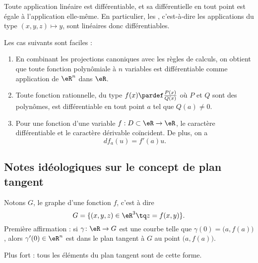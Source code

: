 Toute application linéaire est différentiable, et sa différentielle en
tout point est égale à l'application elle-même. En particulier, les
, c'est-à-dire les applications du type
$(x,y,z) \mapsto y$, sont linéaires donc différentiables.

\begin{example}
Les cas suivants sont faciles :
  \begin{enumerate}
  \item En combinant les projections canoniques avec les règles de
    calculs, on obtient que toute fonction polynômiale à $n$ variables
    est différentiable comme application de $\eR^n$ dans $\eR$.

  \item Toute fonction rationnelle, du type $f(x) \pardef
    \frac{P(x)}{Q(x)}$ où $P$ et $Q$ sont des polynômes, est
    différentiable en tout point $a$ tel que $Q(a) \neq 0$.

  \item Pour une fonction d'une variable $f : D \subset \eR \to
    \eR$, le caractère différentiable et le caractère dérivable
    coïncident. De plus, on a
    \begin{equation*}
      d f_a(u) = f'(a) u.
    \end{equation*}
  \end{enumerate}
\end{example}

                    \subsection{Notes idéologiques sur le concept de plan tangent}
\label{ssecConceptPlanTag}

Notons $G$, le graphe d'une fonction $f$, c'est à dire
\begin{equation}
    G=\{ (x,y,z)\in\eR^3\tq z=f(x,y) \}.
\end{equation}
Première affirmation : si $\gamma\colon \eR\to G$ est une courbe telle que $\gamma(0)=\big( a,f(a) \big)$, alors $\gamma'(0)\in\eR^n$ est dans le plan tangent à $G$ au point $\big( a,f(a) \big)$.

Plus fort : tous les éléments du plan tangent sont de cette forme.

